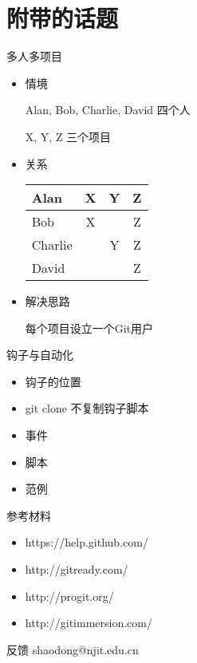 \part{附带的话题}

\begin{frame}[<+->]{多人多项目}
    \begin{itemize}
        \item 情境

        Alan, Bob, Charlie, David 四个人

        X, Y, Z 三个项目
        \item 关系

\begin{center}
    \begin{tabular}{l|c c c}
        \hline
        Alan    &   X  &  Y  &  Z  \\ \hline
        Bob     &   X  &     &  Z  \\ \hline
        Charlie &      &  Y  &  Z  \\ \hline
        David   &      &     &  Z  \\ \hline
    \end{tabular}
\end{center}

        \item 解决思路

        每个项目设立一个Git用户
    \end{itemize}
\end{frame}


\begin{frame}[<+->][fragile]{钩子与自动化}
    \begin{itemize}
        \item 钩子的位置
        \item git clone 不复制钩子脚本
        \item 事件
        \item 脚本
        \item 范例
    \end{itemize}
\end{frame}

\begin{frame}[fragile]{参考材料}
    \begin{itemize}
        \item https://help.github.com/
        \item http://gitready.com/
        \item http://progit.org/
        \item http://gitimmersion.com/
    \end{itemize}
\end{frame}

\begin{frame}[<+->][fragile]{反馈}
shaodong@njit.edu.cn
\end{frame}

